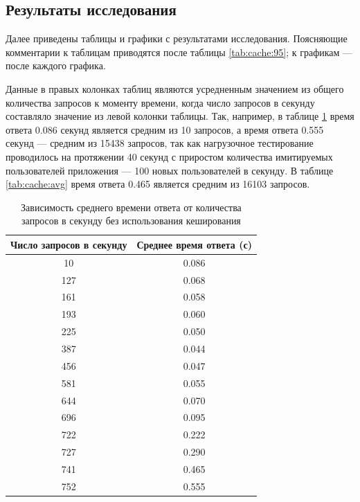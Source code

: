 \subsection{Результаты исследования}

Далее приведены таблицы и графики с результатами исследования.
Поясняющие комментарии к таблицам приводятся после таблицы \ref{tab:cache:95}; к графикам --- после каждого графика.

Данные в правых колонках таблиц являются усредненным значением из общего количества запросов к моменту времени, когда число запросов в секунду составляло значение из левой колонки таблицы.
Так, например, в таблице \ref{tab:nocache:avg} время ответа 0.086 секунд является средним из 10 запросов, а время ответа 0.555 секунд --- средним из 15438 запросов, так как нагрузочное тестирование проводилось на протяжении 40 секунд с приростом количества имитируемых пользователей приложения --- 100 новых пользователей в секунду.
В таблице \ref{tab:cache:avg} время ответа 0.465 является средним из  16103 запросов.

\begin{table}[H]
\centering
\caption{Зависимость среднего времени ответа от количества запросов в секунду без использования кеширования}
\begin{tabular}{|c|c|}
\hline
    \textbf{Число запросов в секунду} & \textbf{Среднее время ответа (с)} \\ \hline
     10 & 0.086 \\ \hline             
    127 & 0.068 \\ \hline             
    161 & 0.058 \\ \hline             
    193 & 0.060 \\ \hline             
    225 & 0.050 \\ \hline             
    387 & 0.044 \\ \hline             
    456 & 0.047 \\ \hline             
    581 & 0.055 \\ \hline             
    644 & 0.070 \\ \hline             
    696 & 0.095 \\ \hline             
    722 & 0.222 \\ \hline             
    727 & 0.290 \\ \hline             
    741 & 0.465 \\ \hline             
    752 & 0.555 \\ \hline             
\end{tabular}
\label{tab:nocache:avg}
\end{table}

